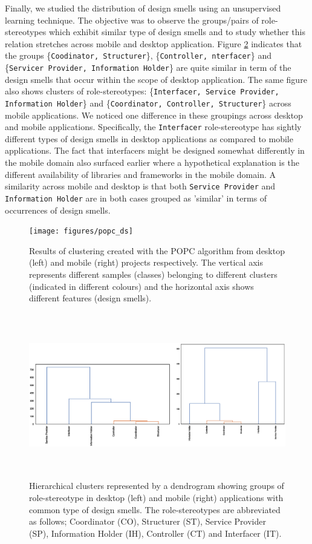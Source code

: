 \documentclass[AMA,Times1COL]{WileyNJDv5} %
\begin{document}
	Finally, we studied the distribution of design smells using an unsupervised learning technique. The objective was to observe the groups/pairs of role-stereotypes which exhibit similar type of design smells and to study whether this relation stretches across mobile and desktop application. Figure \ref{fig:dendogram_rs} indicates that the groups \{{\tt Coodinator, Structurer}\}, 
	\{{\tt Controller, nterfacer}\} and 
	\{{\tt Servicer Provider, Information Holder}\} are quite similar in term of the design smells that occur within the scope of desktop application. The same figure also shows clusters of role-stereotypes:  \{{\tt Interfacer, Service Provider, Information Holder}\} and \{{\tt Coordinator, Controller, Structurer}\} across mobile applications. 
	We noticed one difference in these groupings across desktop and mobile applications. Specifically, the {\tt Interfacer} role-stereotype has sightly different types of design smells in desktop applications as compared to mobile applications. The fact that interfacers might be designed somewhat differently in the mobile domain also surfaced earlier where a hypothetical explanation is the different availability of libraries and frameworks in the mobile domain.
	A similarity across mobile and desktop is that both {\tt Service Provider} and {\tt Information Holder} are in both cases grouped as 'similar' in terms of occurrences of design smells.
	
	\begin{figure}[!h]
		\centering
		\texttt{[image: figures/popc\_ds]}
		\caption{Results of clustering created with the POPC algorithm from desktop (left) and mobile (right) projects respectively. The vertical axis represents different samples (classes) belonging to different clusters (indicated in different colours) and the horizontal axis shows different features (design smells).}
			\label{fig:popc_all}
	\end{figure}
	\begin{figure}[!h]
		\centering
		\includegraphics[width=\textwidth,height=17pc]{figures/dendogram_rs.eps}
		\caption{Hierarchical clusters represented by a dendrogram showing groups of role-stereotype in desktop (left) and mobile (right) applications with common type of design smells. The role-stereotypes are abbreviated as follows; Coordinator (CO), Structurer (ST), Service Provider (SP), Information Holder (IH), Controller (CT) and Interfacer (IT).}
		\label{fig:dendogram_rs}
	\end{figure}
	
\end{document}

